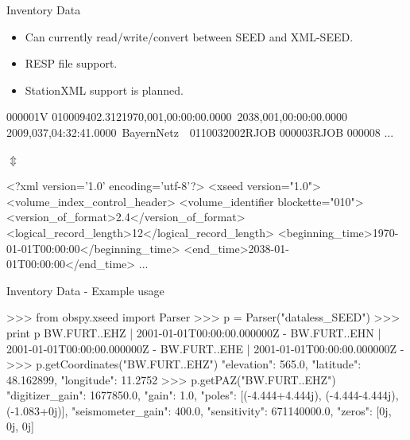 \documentclass[handout]{beamer}
\begin{document}
\begin{frame}{Inventory Data}
    \begin{itemize}
        \item Can currently read/write/convert between SEED and XML-SEED.
        \item RESP file support.
        \item StationXML support is planned.
    \end{itemize}


\footnotesize
\begin{myColorBox}{0.95}{}
\begin{semiverbatim}
000001V 010009402.3121970,001,00:00:00.0000~2038,001,00:00:00.0000~
2009,037,04:32:41.0000~BayernNetz~~0110032002RJOB 000003RJOB 000008
...
\end{semiverbatim}
\end{myColorBox}

\large
\begin{center}
    $\Updownarrow$
\end{center}

\footnotesize


\begin{myColorBox}{0.95}{}
\begin{semiverbatim}
<?xml version='1.0' encoding='utf-8'?>
<xseed version="1.0">
  <volume_index_control_header>
    <volume_identifier blockette="010">
      <version_of_format>2.4</version_of_format>
      <logical_record_length>12</logical_record_length>
      <beginning_time>1970-01-01T00:00:00</beginning_time>
      <end_time>2038-01-01T00:00:00</end_time>
...
\end{semiverbatim}
\end{myColorBox}

\normalsize

\end{frame}

\begin{frame}{Inventory Data - Example usage}
\begin{myColorBox}{0.95}{}
\begin{python}
>>> from obspy.xseed import Parser
>>> p = Parser("dataless_SEED")
>>> print p
BW.FURT..EHZ | 2001-01-01T00:00:00.000000Z -
BW.FURT..EHN | 2001-01-01T00:00:00.000000Z -
BW.FURT..EHE | 2001-01-01T00:00:00.000000Z -
>>> p.getCoordinates("BW.FURT..EHZ")
{"elevation": 565.0, "latitude": 48.162899,
 "longitude": 11.2752}
>>> p.getPAZ("BW.FURT..EHZ")
{"digitizer_gain": 1677850.0,
 "gain": 1.0,
 "poles": [(-4.444+4.444j), (-4.444-4.444j), (-1.083+0j)],
 "seismometer_gain": 400.0,
 "sensitivity": 671140000.0,
 "zeros": [0j, 0j, 0j]}
\end{python}
\end{myColorBox}
\end{frame}
\end{document}
